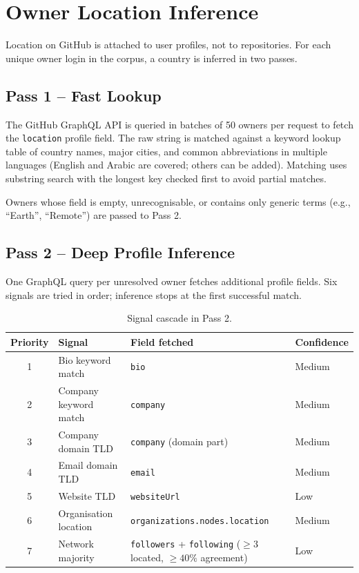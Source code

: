 \documentclass[11pt, a4paper]{article}
\begin{document}
\newpage

\section{Owner Location Inference}

Location on GitHub is attached to user profiles, not to repositories. For
each unique owner login in the corpus, a country is inferred in two passes.

\subsection*{Pass 1 -- Fast Lookup}

The GitHub GraphQL API is queried in batches of 50 owners per request to
fetch the \texttt{location} profile field. The raw string is matched against
a keyword lookup table of country names, major cities, and common
abbreviations in multiple languages (English and Arabic are covered; others
can be added). Matching uses substring search with the longest key checked
first to avoid partial matches.

Owners whose field is empty, unrecognisable, or contains only generic terms
(e.g., ``Earth'', ``Remote'') are passed to Pass 2.

\subsection*{Pass 2 -- Deep Profile Inference}

One GraphQL query per unresolved owner fetches additional profile fields. Six
signals are tried in order; inference stops at the first successful match.

\begin{table}[h]
\centering
\caption{Signal cascade in Pass 2.}
\begin{tabular}{@{}clll@{}}
\toprule
\textbf{Priority} & \textbf{Signal} & \textbf{Field fetched} & \textbf{Confidence} \\
\midrule
1 & Bio keyword match    & \texttt{bio}                        & Medium \\
2 & Company keyword match & \texttt{company}                   & Medium \\
3 & Company domain TLD   & \texttt{company} (domain part)      & Medium \\
4 & Email domain TLD     & \texttt{email}                      & Medium \\
5 & Website TLD          & \texttt{websiteUrl}                 & Low    \\
6 & Organisation location & \texttt{organizations.nodes.location} & Medium \\
7 & Network majority     & \texttt{followers} + \texttt{following} ($\geq 3$ located, $\geq 40\%$ agreement) & Low \\
\bottomrule
\end{tabular}
\end{table}
\end{document}
